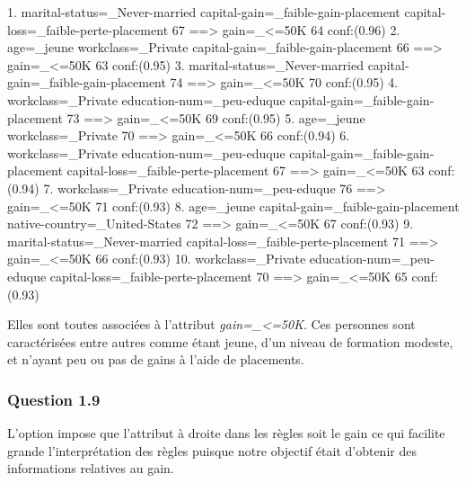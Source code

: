 \documentclass[a4paper,12pt]{article}
\begin{document}
 1.  marital-status=_Never-married  capital-gain=_faible-gain-placement  capital-loss=_faible-perte-placement 67 ==>  gain=_<=50K 64    conf:(0.96)
 2. age=_jeune  workclass=_Private  capital-gain=_faible-gain-placement 66 ==>  gain=_<=50K 63    conf:(0.95)
 3.  marital-status=_Never-married  capital-gain=_faible-gain-placement 74 ==>  gain=_<=50K 70    conf:(0.95)
 4.  workclass=_Private  education-num=_peu-eduque  capital-gain=_faible-gain-placement 73 ==>  gain=_<=50K 69    conf:(0.95)
 5. age=_jeune  workclass=_Private 70 ==>  gain=_<=50K 66    conf:(0.94)
 6.  workclass=_Private  education-num=_peu-eduque  capital-gain=_faible-gain-placement  capital-loss=_faible-perte-placement 67 ==>  gain=_<=50K 63    conf:(0.94)
 7.  workclass=_Private  education-num=_peu-eduque 76 ==>  gain=_<=50K 71    conf:(0.93)
 8. age=_jeune  capital-gain=_faible-gain-placement  native-country=_United-States 72 ==>  gain=_<=50K 67    conf:(0.93)
 9.  marital-status=_Never-married  capital-loss=_faible-perte-placement 71 ==>  gain=_<=50K 66    conf:(0.93)
10.  workclass=_Private  education-num=_peu-eduque  capital-loss=_faible-perte-placement 70 ==>  gain=_<=50K 65    conf:(0.93)

Elles sont toutes associées à l'attribut \textit{gain=_<=50K}. Ces personnes sont caractérisées entre autres comme étant jeune, d'un niveau de formation modeste, et n'ayant peu ou pas de gains à l'aide de placements.

\subsubsection{Question 1.9}
L'option  impose que l'attribut à droite dans les règles soit le gain ce qui facilite grande l'interprétation des règles puisque notre objectif était d'obtenir des informations relatives au gain.
\end{document}
